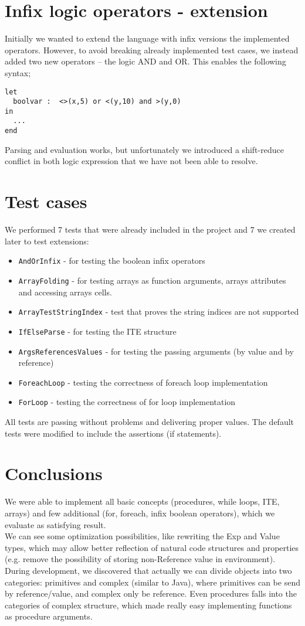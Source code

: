 \documentclass[10pt]{scrartcl}
\begin{document}
\section{Infix logic operators - extension}
Initially we wanted to extend the language with infix versions the implemented operators. However, to avoid breaking already implemented test cases, we instead added two new operators -- the logic AND and OR. This enables the following syntax;
\begin{lstlisting}
let
  boolvar :  <>(x,5) or <(y,10) and >(y,0)
in
  ...
end
\end{lstlisting}
Parsing and evaluation works, but unfortunately we introduced a shift-reduce conflict in both logic expression that we have not been able to resolve.
\section{Test cases}
We performed 7 tests that were already included in the project and 7 we created later to test extensions:
\begin{itemize}
\item \texttt{AndOrInfix} - for testing the boolean infix operators
\item \texttt{ArrayFolding} - for testing arrays as function arguments, arrays attributes and accessing arrays cells.
\item \texttt{ArrayTestStringIndex} - test that proves the string indices are not supported
\item \texttt{IfElseParse} - for testing the ITE structure
\item \texttt{ArgsReferencesValues} - for testing the passing arguments (by value and by reference)
\item \texttt{ForeachLoop} - testing the correctness of foreach loop implementation
\item \texttt{ForLoop} - testing the correctness of for loop implementation
\end{itemize}
All tests are passing without problems and delivering proper values. 
The default tests were modified to include the assertions (if statements).

\section{Conclusions}
We were able to implement all basic concepts (procedures, while loops, ITE, arrays) and few additional (for, foreach, infix boolean operators), which we evaluate as satisfying result. \\
We can see some optimization possibilities, like rewriting the Exp and Value types, which may allow better reflection of natural code structures and properties (e.g. remove the possibility of storing non-Reference value in environment). \\
During development, we discovered that actually we can divide objects into two categories: primitives and complex (similar to Java), where primitives can be send by reference/value, and complex only be reference. Even procedures falls into the categories of complex structure, which made really easy implementing functions as procedure arguments.
\end{document}

